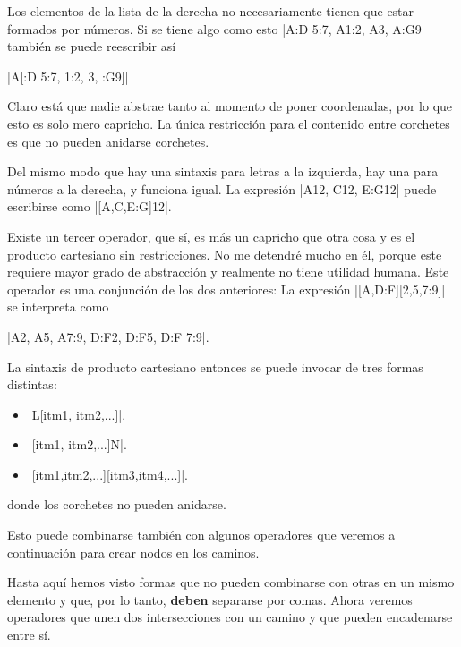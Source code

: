 	Los elementos de la lista de la derecha no necesariamente tienen que estar formados por n\'umeros. Si se tiene algo como esto |A:D 5:7, A1:2, A3, A:G9| tambi\'en se puede reescribir as\'i
	\begin{center}
		|A[:D 5:7, 1:2, 3, :G9]|
	\end{center}
	Claro est\'a que nadie abstrae tanto al momento de poner coordenadas, por lo que esto es solo mero capricho. La \'unica restricci\'on para el contenido entre corchetes es que no pueden anidarse corchetes. 
	
	Del mismo modo que hay una sintaxis para letras a la izquierda, hay una para n\'umeros a la derecha, y funciona igual. La expresi\'on |A12, C12, E:G12| puede escribirse como |[A,C,E:G]12|.
	
	Existe un tercer operador, que s\'i, es m\'as un capricho que otra cosa y es el producto cartesiano sin restricciones. No me detendr\'e mucho en \'el, porque este requiere mayor grado de abstracci\'on y realmente no tiene utilidad humana. Este operador es una conjunci\'on de los dos anteriores: La expresi\'on |[A,D:F][2,5,7:9]| se interpreta como
	\begin{center}
		|A2, A5, A7:9, D:F2, D:F5, D:F 7:9|.
	\end{center}
 
	\begin{codeexample}[width=4cm]
		\begin{goban}
			\stones[b]{[A, D:F][2, 5, 7:9]}
		\end{goban}
	\end{codeexample}

	La sintaxis de producto cartesiano entonces se puede invocar de tres formas distintas:
\begin{itemize}
	\item |L[itm1, itm2,...]|.
	\item |[itm1, itm2,...]N|.
	\item |[itm1,itm2,...][itm3,itm4,...]|.
\end{itemize}
donde los corchetes no pueden anidarse. 

Esto puede combinarse tambi\'en con algunos operadores que veremos a continuaci\'on para crear nodos en los caminos.

Hasta aquí hemos visto formas que no pueden combinarse con otras en un mismo elemento y que, por lo tanto, \textbf{deben} separarse por comas. Ahora veremos operadores que unen dos intersecciones con un camino y que pueden encadenarse entre sí.

